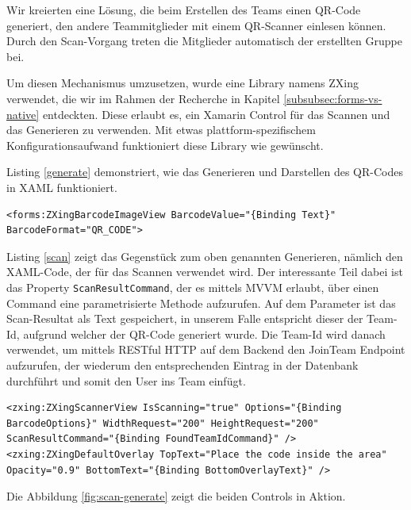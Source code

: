 Wir kreierten eine Lösung, die beim Erstellen des Teams einen QR-Code generiert, den andere Teammitglieder mit einem QR-Scanner einlesen können. Durch den Scan-Vorgang treten die Mitglieder automatisch der erstellten Gruppe bei.

Um diesen Mechanismus umzusetzen, wurde eine Library namens ZXing \cite{zxing.net} verwendet, die wir im Rahmen der Recherche in Kapitel \ref{subsubsec:forms-vs-native} entdeckten. Diese erlaubt es, ein Xamarin Control für das Scannen und das Generieren zu verwenden. Mit etwas plattform-spezifischem Konfigurationsaufwand funktioniert diese Library wie gewünscht.

Listing \ref{generate} demonstriert, wie das Generieren und Darstellen des QR-Codes in XAML funktioniert.


\begin{lstlisting}[label=generate,caption=Verwendung der ZXing Library fürs Generieren des QR-Codes]
<forms:ZXingBarcodeImageView BarcodeValue="{Binding Text}"  BarcodeFormat="QR_CODE">
\end{lstlisting}


Listing \ref{scan} zeigt das Gegenstück zum oben genannten Generieren, nämlich den XAML-Code, der für das Scannen verwendet wird. Der interessante Teil dabei ist das Property \texttt{ScanResultCommand}, der es mittels MVVM erlaubt, über einen Command eine parametrisierte Methode aufzurufen. Auf dem Parameter ist das Scan-Resultat als Text gespeichert, in unserem Falle entspricht dieser der Team-Id, aufgrund welcher der QR-Code generiert wurde. Die Team-Id wird danach verwendet, um mittels RESTful HTTP auf dem Backend den JoinTeam Endpoint aufzurufen, der wiederum den entsprechenden Eintrag in der Datenbank durchführt und somit den User ins Team einfügt.


\begin{lstlisting}[label=scan,caption=XAML fürs Scannen von QR-Codes]
<zxing:ZXingScannerView IsScanning="true" Options="{Binding BarcodeOptions}" WidthRequest="200" HeightRequest="200" ScanResultCommand="{Binding FoundTeamIdCommand}" />
<zxing:ZXingDefaultOverlay TopText="Place the code inside the area" Opacity="0.9" BottomText="{Binding BottomOverlayText}" />
\end{lstlisting}

Die Abbildung \ref{fig:scan-generate} zeigt die beiden Controls in Aktion. 

